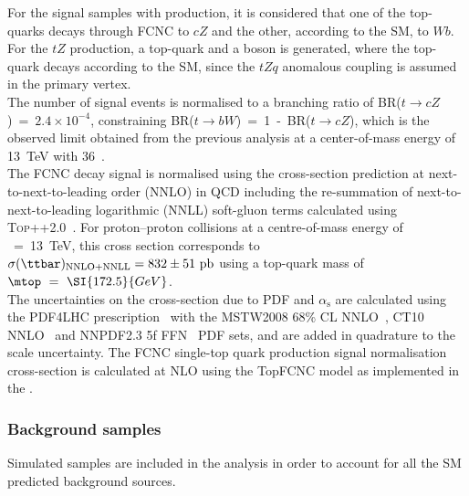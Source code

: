 \noindent For the signal samples with \ttbar production, it is considered that one of the top-quarks decays through FCNC to $cZ$ and the other, according to the SM, to $Wb$.\\ 
For the $tZ$ production, a top-quark and a \PZ boson is generated, where the top-quark decays according to the SM, since the $tZq$ anomalous coupling is assumed in the primary vertex. \\
The number of signal events is normalised to a branching ratio of  \mbox{BR($t\rightarrow cZ$) = $2.4\times10^{-4}$}, constraining \mbox{BR($t\rightarrow bW$) = 1 - BR($t\rightarrow cZ$)}, which is the observed limit obtained from
the previous analysis at a center-of-mass energy of \SI{13}{\TeV} with \SI{36}{\ifb}~\cite{TOPQ-2017-06}. \\
The FCNC \ttbar decay signal
is normalised using the \ttbar cross-section prediction at next-to-next-to-leading order (NNLO)
in QCD including the re-summation of next-to-next-to-leading logarithmic (NNLL) soft-gluon terms calculated using
\textsc{Top++2.0}~\cite{Beneke:2011mq,Cacciari:2011hy,Baernreuther:2012ws,Czakon:2012zr,Czakon:2012pz,Czakon:2013goa,Czakon:2011xx}.
For proton--proton collisions at a centre-of-mass energy of \rts~=~\SI{13}{\TeV}, this cross section corresponds to
$\sigma(\ttbar)_{\textrm{NNLO+NNLL}} = \mathrm{832\pm51~pb}$ using a top-quark mass of $\mtop~ =~\SI{172.5}{GeV}$.\\
The uncertainties on the cross-section due to PDF and $\alpha_{\textrm{s}}$ are calculated using the PDF4LHC prescription~\cite{Botje:2011sn}
with the MSTW2008 68\% CL NNLO~\cite{Martin:2009iq,Martin:2009bu}, CT10 NNLO~\cite{Lai:2010vv,Gao:2013xoa} and \textsc{NNPDF2.3} 5f FFN~\cite{Ball:2012cx} PDF sets,
and are added in quadrature to the scale uncertainty.
The FCNC single-top quark production signal normalisation cross-section is calculated at 
NLO using the TopFCNC model as implemented in the \aMCatNLO.  \\

\subsubsection{Background samples}
\label{sec:samples:mc:bkg}

Simulated samples are included in the analysis in order to account for all the SM predicted background sources. 


